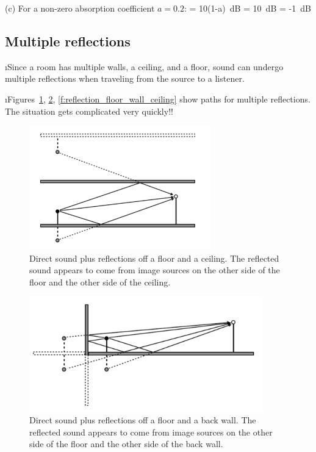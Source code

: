 (c) For a non-zero absorption coefficient $a=0.2$:
%
\be
{} 
= 10\log(1-a)~{\rm dB}
= 10~{\rm dB}
= -1~{\rm dB}
\ee

\ei
\subsection{Multiple reflections}
\bi

\i Since a room has multiple walls, a ceiling, and a floor, 
sound can undergo multiple reflections when traveling from
the source to a listener.
 
\i Figures~\ref{f:reflection_floor_ceiling},
\ref{f:reflection_floor_wall},
\ref{f:reflection_floor_wall_ceiling} show paths for 
multiple reflections.
The situation gets complicated very quickly!!
%
\begin{figure}[htbp]
\begin{center}
\includegraphics[width=0.7\textwidth]{reflection_floor_ceiling}
\caption{Direct sound plus reflections off a floor and a ceiling.
The reflected sound appears to come from image
sources on the other side of the floor and the other side 
of the ceiling.}
\label{f:reflection_floor_ceiling}
\end{center}
\end{figure}
%
%
\begin{figure}[htbp]
\begin{center}
\includegraphics[width=0.9\textwidth]{reflection_floor_wall}
\caption{Direct sound plus reflections off a floor and a back wall.
The reflected sound appears to come from image
sources on the other side of the floor and the other side 
of the back wall.}
\label{f:reflection_floor_wall}
\end{center}
\end{figure}
